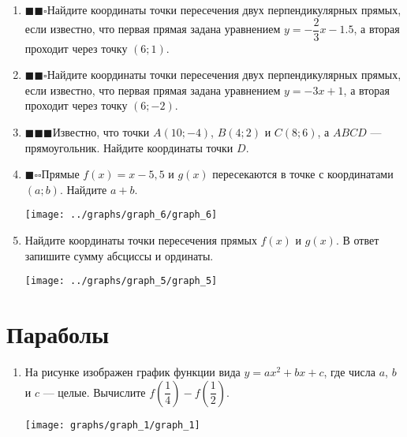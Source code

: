 \documentclass[10pt, a4paper]{article}
\newcommand{\ranswer}[1]{\textcolor{silver}{\begin{flushright}\vspace{-1em}\fbox{#1}\end{flushright}}}
\newcommand{\leveli}{\textcolor{dark}{$\blacksquare\square\square$}\hspace{0.5em}}
\newcommand{\levelii}{\textcolor{dark}{$\blacksquare\blacksquare\square$}\hspace{0.5em}}
\newcommand{\leveliii}{\textcolor{dark}{$\blacksquare\blacksquare\blacksquare$}\hspace{0.5em}}
\begin{document}
\begin{enumerate}
	\item \levelii Найдите координаты точки пересечения двух перпендикулярных прямых, если известно, что первая прямая задана уравнением $y=-\dfrac{2}{3}x-1.5$, а вторая проходит через точку $(6;1)$. \ranswer{$(3;-3,5)$}
	\item \levelii Найдите координаты точки пересечения двух перпендикулярных прямых, если известно, что первая прямая задана уравнением $y=-3x+1$, а вторая проходит через точку $(6;-2)$. \ranswer{$(1,5;-3,5)$}
	\item \leveliii Известно, что точки $A(10;-4)$, $B(4;2)$ и $C(8;6)$, а $ABCD$ --- прямоугольник. Найдите координаты точки $D$. \ranswer{$(14;0)$}
	\item
	\begin{minipage}[t]{0.6\textwidth}
		\leveli Прямые $f(x)=x-5,5$ и $g(x)$ пересекаются в точке с координатами $(a;b)$. Найдите $a+b$. \ranswer{$-10$}
	\end{minipage}
	\begin{minipage}[t]{0.3\textwidth}
		\texttt{[image: ../graphs/graph\_6/graph\_6]}
	\end{minipage}
	\item
	\begin{minipage}[t]{0.6\textwidth}
		Найдите координаты точки пересечения прямых $f(x)$ и $g(x)$. В ответ запишите сумму абсциссы и ординаты. \ranswer{$3,75$}
	\end{minipage}
	\begin{minipage}[t]{0.3\textwidth}
		\texttt{[image: ../graphs/graph\_5/graph\_5]}
	\end{minipage}
\end{enumerate}
\section{Параболы}
\begin{enumerate}
	\item
	\begin{minipage}[t][8cm][t]{0.5\textwidth}
		На рисунке изображен график функции вида $y=ax^2+bx+c$, где числа $a$, $b$ и $c$ — целые. Вычислите $f\left(\dfrac{1}{4}\right)-f\left(\dfrac{1}{2}\right)$.
		\begin{flushright}
		\end{flushright}
	\end{minipage}
	\begin{minipage}[t][8cm][t]{0.5\textwidth}
		\hspace{10pt}
		\texttt{[image: graphs/graph\_1/graph\_1]}
	\end{minipage}
\end{enumerate}
\end{document}
